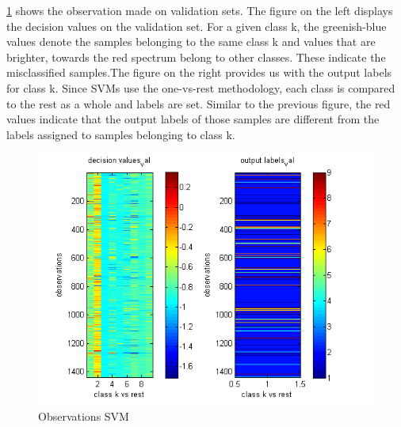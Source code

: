 \documentclass[letterpaper,12pt, onecolumn]{article}%
\begin{document}
\cref{fig:obssvm} shows the observation made on validation sets. The figure on the left displays the decision values on the validation set. For a given class k, the greenish-blue values denote the samples belonging to the same class k and values that are brighter, towards the red spectrum belong to other classes. These indicate the misclassified samples.The figure on the right provides us with the output labels for class k. Since SVMs use the one-vs-rest methodology, each class is compared to the rest as a whole and labels are set. Similar to the previous figure, the red values indicate that the output labels of those samples are different from the labels assigned to samples belonging to class k. 
\begin{figure}[!hbtp]
 	  \centering
 	   \includegraphics[scale=0.75] {svm_dec_val.png} 
 	   \caption{Observations SVM}
       \label{fig:obssvm}
\end{figure}
\end{document}
